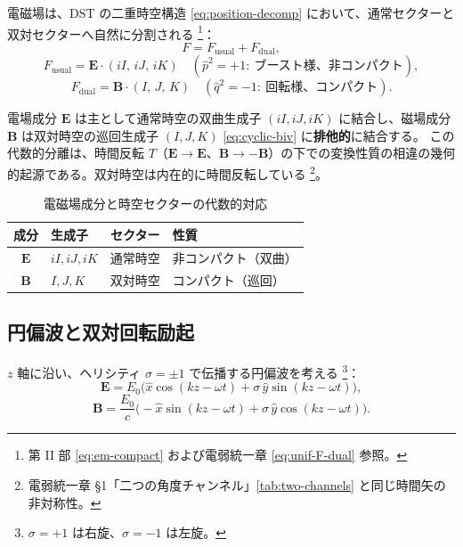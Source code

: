 \documentclass[dvipdfmx,a4paper,oneside]{jsbook}
\numberwithin{equation}{chapter}
\begin{document}
電磁場は、DST の二重時空構造 \eqref{eq:position-decomp} において、通常セクターと双対セクターへ自然に分割される \footnote{第 II 部 \eqref{eq:em-compact} および電弱統一章 \eqref{eq:unif-F-dual} 参照。}：
\begin{equation}
  F = F_{\mathrm{usual}} + F_{\mathrm{dual}},
  \label{eq:graveng-F-split}
\end{equation}
\begin{equation}
  F_{\mathrm{usual}} = \mathbf{E}\cdot(iI,\, iJ,\, iK)
  \quad (\hat{p}^2 = +1:\ \text{ブースト様、非コンパクト}),
  \label{eq:graveng-F-usual}
\end{equation}
\begin{equation}
  F_{\mathrm{dual}} = \mathbf{B}\cdot(I,\, J,\, K)
  \quad (\hat{q}^2 = -1:\ \text{回転様、コンパクト}).
  \label{eq:graveng-F-dual}
\end{equation}

電場成分 \(\mathbf{E}\) は主として通常時空の双曲生成子 \((iI, iJ, iK)\) に結合し、磁場成分 \(\mathbf{B}\) は双対時空の巡回生成子 \((I, J, K)\) \eqref{eq:cyclic-biv} に\textbf{排他的}に結合する。
この代数的分離は、時間反転 \(T\)（\(\mathbf{E} \to \mathbf{E}\)、\(\mathbf{B} \to -\mathbf{B}\)）の下での変換性質の相違の幾何的起源である。双対時空は内在的に時間反転している \footnote{電弱統一章 §1「二つの角度チャンネル」\eqref{tab:two-channels} と同じ時間矢の非対称性。}。

\begin{table}[htbp]
  \centering
  \caption{電磁場成分と時空セクターの代数的対応}
  \label{tab:graveng-EM-split}
  \begin{tabular}{@{}clcl@{}}
    \toprule
    成分 & 生成子 & セクター & 性質 \\
    \midrule
    \(\mathbf{E}\) & \(iI, iJ, iK\) & 通常時空 & 非コンパクト（双曲） \\
    \(\mathbf{B}\) & \(I, J, K\) & 双対時空 & コンパクト（巡回） \\
    \bottomrule
  \end{tabular}
\end{table}

\subsection{円偏波と双対回転励起}

\(z\) 軸に沿い、ヘリシティ \(\sigma = \pm 1\) で伝播する円偏波を考える \footnote{\(\sigma = +1\) は右旋、\(\sigma = -1\) は左旋。}：
\begin{equation}
  \mathbf{E}
  = E_0\bigl(\hat{x}\cos(kz - \omega t) + \sigma\,\hat{y}\sin(kz - \omega t)\bigr),
  \label{eq:graveng-E-cp}
\end{equation}
\begin{equation}
  \mathbf{B}
  = \frac{E_0}{c}\bigl(-\hat{x}\sin(kz - \omega t) + \sigma\,\hat{y}\cos(kz - \omega t)\bigr).
  \label{eq:graveng-B-cp}
\end{equation}
\end{document}
